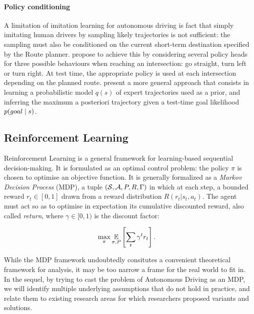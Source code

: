 \paragraph{Policy conditioning} A limitation of imitation learning for autonomous driving is fact that simply imitating human drivers by sampling likely trajectories is not sufficient: the sampling must also be conditioned on the current short-term destination specified by the Route planner. \citep{Codevilla2018} propose to achieve this by considering several policy heads for three possible behaviours when reaching an intersection: go straight, turn left or turn right. At test time, the appropriate policy is used at each intersection depending on the planned route. \citep{Rhinehart2020} present a more general approach that consists in learning a probabilistic model $q(s)$ of expert trajectories used as a prior, and inferring the maximum a posteriori trajectory given a test-time goal likelihood $p\lparen goal\mid s\rparen$.

\subsection{Reinforcement Learning}

Reinforcement Learning is a general framework for learning-based sequential decision-making. It is formulated as an optimal control problem: the policy $\pi$ is chosen to optimise an objective function. It is generally formalized as a \emph{Markov Decision Process} (MDP), a tuple $(\mathcal{S}, \mathcal{A}, P, R, \Gamma)$ in which at each step, a bounded reward $r_t\in[0, 1]$ drawn from a reward distribution $R(r_t|s_t,a_t)$. The agent must act so as to optimise in expectation its cumulative discounted reward, also called \emph{return}, where $\gamma\in[0,1)$ is the discount factor:

\begin{equation*}
\max_{\pi}\operatorname*{\mathbb{E}}_{\pi, P} \left[\sum_t \gamma^t r_t\right].
\end{equation*}


While the MDP framework undoubtedly consitutes a convenient theoretical framework for analysis, it may be too narrow a frame for the real world to fit in. In the sequel, by trying to cast the problem of Autonomous Driving as an MDP, we will identify multiple underlying assumptions that do not hold in practice, and relate them to existing research areas for which researchers proposed variants and solutions.

